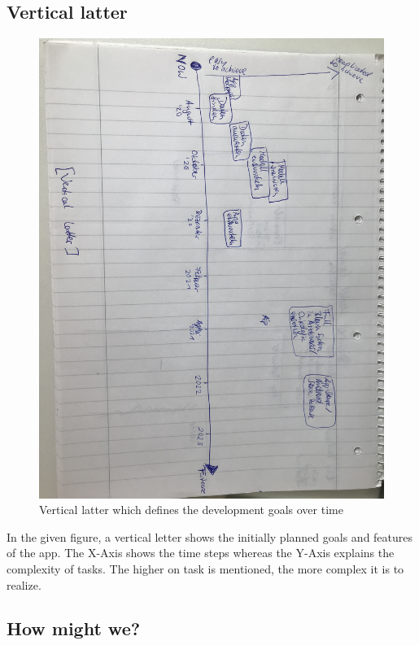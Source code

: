 \subsection{Vertical latter}

\begin{figure}[h!]
	\centering
	\includegraphics[width=1\textwidth]{images/verticallatter.jpg}
	\caption{Vertical latter which defines the development goals over time}
	\label{verticallatter}
\end{figure}

In the given figure, a vertical letter shows the initially planned goals and features of the app. The X-Axis shows the time steps whereas the Y-Axis explains the complexity of tasks. The higher on task is mentioned, the more complex it is to realize.

\subsection{How might we?}

